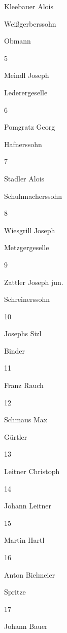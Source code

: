 Kleebauer Alois

Weißgerberssohn

Obmann

5

Meindl Joseph

Lederergeselle



6

Pomgratz Georg

Hafnerssohn



7

Stadler Alois

Schuhmacherssohn



8

Wiesgrill Joseph

Metzgergeselle



9

Zattler Joseph jun.

Schreinerssohn



10

Josephs Sizl

Binder



11

Franz Rauch





12

Schmaus Max

Gürtler



13

Leitner Christoph





14

Johann Leitner





15

Martin Hartl





16

Anton Bielmeier



Spritze

17

Johann Bauer







